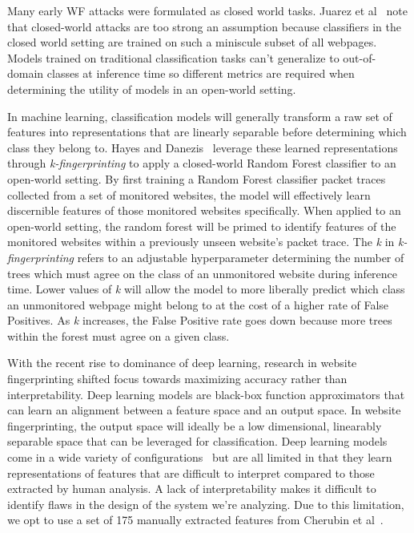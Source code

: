 \documentclass[sigconf,authorversion,nonacm]{acmart}
\begin{document}
Many early WF attacks were formulated as closed world tasks. Juarez et al~\citep{juarez2014critical} note that closed-world attacks are too strong an assumption because classifiers in the closed world setting are trained on such a miniscule subset of all webpages. Models trained on traditional classification tasks can't generalize to out-of-domain classes at inference time so different metrics are required when determining the utility of models in an open-world setting.

In machine learning, classification models will generally transform a raw set of features into representations that are linearly separable before determining which class they belong to. Hayes and Danezis~\citep{hayes2016k} leverage these learned representations through \textit{k-fingerprinting} to apply a closed-world Random Forest classifier to an open-world setting. By first training a Random Forest classifier packet traces collected from a set of monitored websites, the model will effectively learn discernible features of those monitored websites specifically. When applied to an open-world setting, the random forest will be primed to identify features of the monitored websites within a previously unseen website's packet trace. The \textit{k} in \textit{k-fingerprinting} refers to an adjustable hyperparameter determining the number of trees which must agree on the class of an unmonitored website during inference time. Lower values of \textit{k} will allow the model to more liberally predict which class an unmonitored webpage might belong to at the cost of a higher rate of False Positives. As \textit{k} increases, the False Positive rate goes down because more trees within the forest must agree on a given class. 

With the recent rise to dominance of deep learning, research in website fingerprinting shifted focus towards maximizing accuracy rather than interpretability. Deep learning models are black-box function approximators that can learn an alignment between a feature space and an output space. In website fingerprinting, the output space will ideally be a low dimensional, linearably separable space that can be leveraged for classification. Deep learning models come in a wide variety of configurations~\citep{sirinam2018deep,sirinam2019triplet,rimmer2017automated} but are all limited in that they learn representations of features that are difficult to interpret compared to those extracted by human analysis. A lack of interpretability makes it difficult to identify flaws in the design of the system we're analyzing. Due to this limitation, we opt to use a set of 175 manually extracted features from Cherubin et al~\citep{cherubin2017bayes}.
\end{document}
